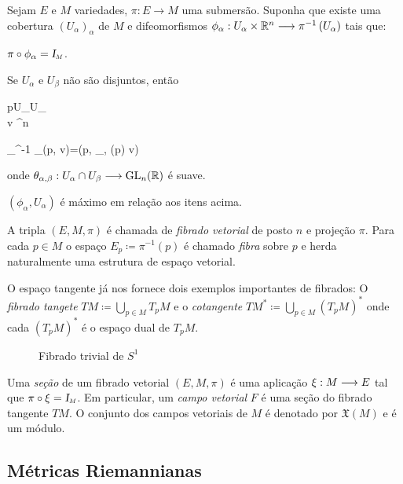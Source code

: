 \begin{definicao}
	Sejam $E$ e $M$ variedades, $\pi: E \rightarrow M$ uma submersão. Suponha que existe uma cobertura $\left(U_\alpha\right)_{\alpha}$ de $M$ e difeomorfismos $\phi_\alpha: U_\alpha \times \mathbb{R}^n \longrightarrow \pi^{-1}\left(U_\alpha\right)$ tais que:
	\begin{itroman}
		\item $\pi \circ \phi_\alpha = \sub\Id M$.
		\item Se $U_\alpha$ e $U_\beta$ não são disjuntos, então 
		\begin{eqspaced*}{\begin{pmatrix} p\in U_\alpha \cap U_\beta\\ v \in \R^n\end{pmatrix}}
			\phi_\beta^{-1} \circ \phi_\alpha(p, v)=\left(p, \theta_{\beta, \alpha}(p) v\right)
		\end{eqspaced*}
		onde $\theta_{\alpha, \beta} : U_\alpha \cap U_\beta \longrightarrow \operatorname{GL}_n(\operatorname{\mathbb{R}})$ é suave.
		\item $\left(\phi_\alpha, U_\alpha\right)$ é máximo em relação aos itens acima.
	\end{itroman}
A tripla $(E, M, \pi)$ é chamada de \textit{fibrado vetorial} de posto $n$ e projeção $\pi$. Para cada $p \in M$ o espaço $E_p\coloneqq \pi^{-1}(p)$ é chamado \textit{fibra} sobre $p$ e herda naturalmente uma estrutura de espaço vetorial.
\end{definicao}

O espaço tangente já nos fornece dois exemplos importantes de fibrados: O \textit{fibrado tangete} $TM \coloneqq \bigcup_{p\in M} T_pM $ e o \textit{cotangente} $TM^* \coloneqq \bigcup_{p\in M} (T_pM)^* $ onde cada $(T_pM)^*$ é o espaço dual de $T_pM$.

\begin{figure}[H]
	\centering
	
	\caption{Fibrado trivial de $S^1$}
\end{figure}

\begin{definicao}
	Uma \textit{seção} de um fibrado vetorial $(E,M,\pi)$ é uma aplicação $\xi : M \longrightarrow E$ tal que $\pi\circ \xi = \sub \Id M$. Em particular, um \textit{campo vetorial} $F$ é uma seção do fibrado tangente $TM$. O conjunto dos campos vetoriais de $M$ é denotado por $\mathfrak X(M)$ e é um módulo. 
\end{definicao}

\subsection{Métricas Riemannianas}

